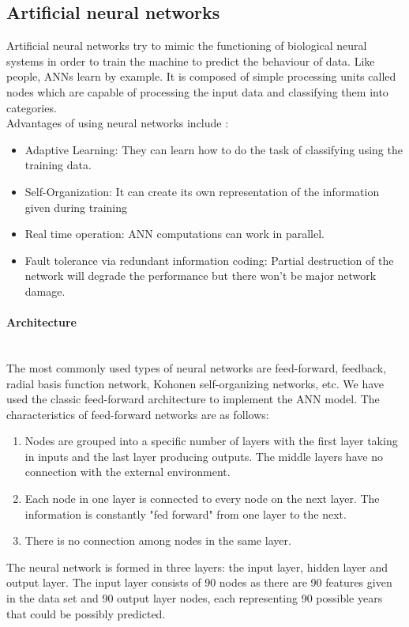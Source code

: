 \documentclass[10pt]{article}
\begin{document}
\subsection{Artificial neural networks}
Artificial neural networks try to mimic the functioning of biological neural systems in order to train the machine to predict the behaviour of data. Like people, ANNs learn by example. It is composed of simple processing units called nodes which are capable of processing the input data and classifying them into categories. \\
Advantages of using neural networks include :\\
\begin{itemize}
	\item Adaptive Learning: They can learn how to do the task of classifying using the training data. 
	\item Self-Organization: It can create its own representation of the information given during training
	\item Real time operation: ANN computations can work in parallel.
	\item Fault tolerance via redundant information coding: Partial destruction of the network will degrade the performance but there won't be major network damage.
\end{itemize}

\paragraph{Architecture} 

\\The most commonly used types of neural networks are feed-forward, feedback, radial basis function network, Kohonen self-organizing networks, etc. We have used the classic feed-forward architecture to implement the ANN model. The characteristics of feed-forward networks are as follows:
\begin{enumerate}
	\item Nodes are grouped into a specific number of layers with the first layer taking in inputs and the last layer producing outputs. The middle layers have no connection with the external environment.

	\item Each node in one layer is connected to every node on the next layer. The information is constantly "fed forward" from one layer to the next.

	\item There is no connection among nodes in the same layer.
\end{enumerate}
The neural network is formed in three layers: the input layer, hidden layer and output layer. The input layer consists of 90 nodes as there are 90 features given in the data set and 90 output layer nodes, each representing 90 possible years that could be possibly predicted. \\
\end{document}
